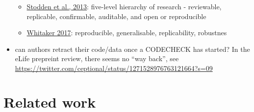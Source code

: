 \documentclass[12pt]{article}
\begin{document}
\begin{itemize}
  \begin{itemize}
  \item
    \href{https://stodden.net/icerm_report.pdf}{Stodden et al., 2013}:
    five-level hierarchy of research - reviewable, replicable,
    confirmable, auditable, and open or reproducible
  \item
    \href{https://figshare.com/articles/Showing_your_working_A_guide_to_reproducible_neuroimaging_analyses/4244996/2}{Whitaker
    2017}: reproducible, generalisable, replicability, robustnes
  \end{itemize}
\item
  can authors retract their code/data once a CODECHECK has started? In
  the eLife prepreint review, there seems no ``way back'', see
  \url{https://twitter.com/ceptional/status/1271528976763121664?s=09}
\end{itemize}

\section*{Related work}\label{related-work-1}
\end{document}
